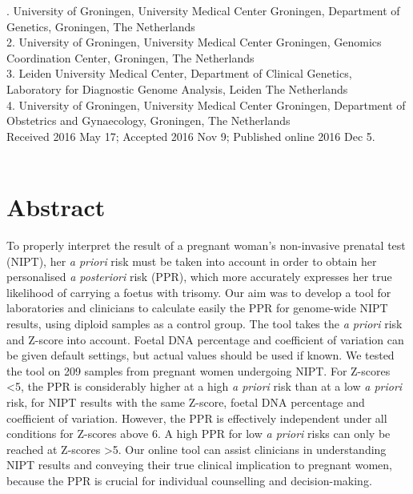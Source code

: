 . University of Groningen, University Medical Center Groningen, Department of Genetics, Groningen, The Netherlands\\
2. University of Groningen, University Medical Center Groningen, Genomics Coordination Center, Groningen, The Netherlands\\
3. Leiden University Medical Center, Department of Clinical Genetics, Laboratory for Diagnostic Genome Analysis, Leiden The Netherlands\\
4. University of Groningen, University Medical Center Groningen, Department of Obstetrics and Gynaecology, Groningen, The Netherlands\\

\noindent
Received 2016 May 17; Accepted 2016 Nov 9; Published online 2016 Dec 5.
\\~\\



\section*{Abstract}\label{abstract}
To properly interpret the result of a pregnant woman’s non-invasive prenatal test (NIPT), her \textsl{a priori} risk must be taken into account in order to obtain her personalised \textsl{a posteriori} risk (PPR), which more accurately expresses her true likelihood of carrying a foetus with trisomy. 
Our aim was to develop a tool for laboratories and clinicians to calculate easily the PPR for genome-wide NIPT results, using diploid samples as a control group. 
The tool takes the \textsl{a priori} risk and Z-score into account. 
Foetal DNA percentage and coefficient of variation can be given default settings, but actual values should be used if known. 
We tested the tool on 209 samples from pregnant women undergoing NIPT. 
For Z-scores \textless 5, the PPR is considerably higher at a high \textsl{a priori} risk than at a low \textsl{a priori} risk, for NIPT results with the same Z-score, foetal DNA percentage and coefficient of variation. However, the PPR is effectively independent under all conditions for Z-scores above 6. 
A high PPR for low \textsl{a priori} risks can only be reached at Z-scores \textgreater 5. 
Our online tool can assist clinicians in understanding NIPT results and conveying their true clinical implication to pregnant women, because the PPR is crucial for individual counselling and decision-making.

